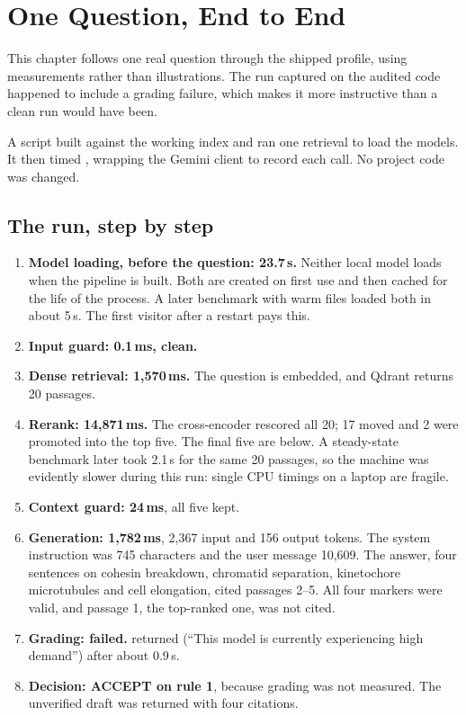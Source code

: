 \chapter{One Question, End to End}
\label{ch:journey}

This chapter follows one real question through the shipped  profile, using measurements rather than illustrations. The run captured on the audited code happened to include a grading failure, which makes it more instructive than a clean run would have been.

\begin{measured}
A script built  against the working index and ran one retrieval to load the models. It then timed , wrapping the Gemini client to record each call. No project code was changed.
\end{measured}

\section{The run, step by step}

\begin{enumerate}
  \item \textbf{Model loading, before the question: 23.7\,s.} Neither local model loads when the pipeline is built. Both are created on first use and then cached for the life of the process. A later benchmark with warm files loaded both in about 5\,s. The first visitor after a restart pays this.
  \item \textbf{Input guard: 0.1\,ms, clean.}
  \item \textbf{Dense retrieval: 1,570\,ms.} The question is embedded, and Qdrant returns 20 passages.
  \item \textbf{Rerank: 14,871\,ms.} The cross-encoder rescored all 20; 17 moved and 2 were promoted into the top five. The final five are below. A steady-state benchmark later took 2.1\,s for the same 20 passages, so the machine was evidently slower during this run: single CPU timings on a laptop are fragile.
  \item \textbf{Context guard: 24\,ms}, all five kept.
  \item \textbf{Generation: 1,782\,ms}, 2,367 input and 156 output tokens. The system instruction was 745 characters and the user message 10,609. The answer, four sentences on cohesin breakdown, chromatid separation, kinetochore microtubules and cell elongation, cited passages 2--5. All four markers were valid, and passage 1, the top-ranked one, was not cited.
  \item \textbf{Grading: failed.}  returned  (``This model is currently experiencing high demand'') after about 0.9\,s.
  \item \textbf{Decision: ACCEPT on rule 1}, because grading was not measured. The unverified draft was returned with four citations.
\end{enumerate}

